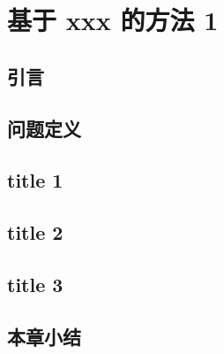\chapter{基于 xxx 的方法 1}
\label{ch3}

\section{引言}
\section{问题定义}
\section{title 1}
\section{title 2}
\section{title 3}
\section{本章小结}
